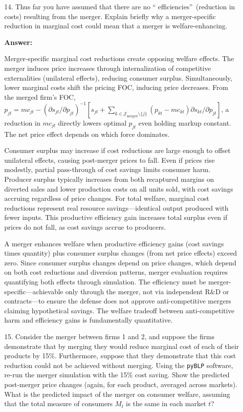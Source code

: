\documentclass[english,11pt]{article}
\begin{document}
\begin{enumerate}
\item[14.] Thus far you have assumed that there are no \textquotedblleft
efficiencies\textquotedblright\ (reduction in costs) resulting from the
merger. Explain briefly why a merger-specific reduction in marginal cost
could mean that a merger is welfare-enhancing.

\textbf{Answer:}

Merger-specific marginal cost reductions create opposing welfare effects. The merger induces price increases through internalization of competitive externalities (unilateral effects), reducing consumer surplus. Simultaneously, lower marginal costs shift the pricing FOC, inducing price decreases. From the merged firm's FOC, $p_{jt} = mc_{jt} - (\partial s_{jt}/\partial p_{jt})^{-1} [s_{jt} + \sum_{k \in \mathcal{J}_{\text{merged}} \setminus \{j\}} (p_{kt} - mc_{kt}) \partial s_{kt}/\partial p_{jt}]$, a reduction in $mc_{jt}$ directly lowers optimal $p_{jt}$ even holding markup constant. The net price effect depends on which force dominates.

Consumer surplus may increase if cost reductions are large enough to offset unilateral effects, causing post-merger prices to fall. Even if prices rise modestly, partial pass-through of cost savings limits consumer harm. Producer surplus typically increases from both recaptured margins on diverted sales and lower production costs on all units sold, with cost savings accruing regardless of price changes. For total welfare, marginal cost reductions represent real resource savings---identical output produced with fewer inputs. This productive efficiency gain increases total surplus even if prices do not fall, as cost savings accrue to producers.

A merger enhances welfare when productive efficiency gains (cost savings times quantity) plus consumer surplus changes (from net price effects) exceed zero. Since consumer surplus changes depend on price changes, which depend on both cost reductions and diversion patterns, merger evaluation requires quantifying both effects through simulation. The efficiency must be merger-specific---achievable only through the merger, not via independent R\&D or contracts---to ensure the defense does not approve anti-competitive mergers claiming hypothetical savings. The welfare tradeoff between anti-competitive harm and efficiency gains is fundamentally quantitative.

\item[15.] Consider the merger between firms 1 and 2, and suppose the firms
demonstrate that by merging they would reduce marginal cost of each of their
products by 15\%. Furthermore, suppose that they demonstrate that this cost
reduction could not be achieved without merging.    Using the \texttt{pyBLP} software, re-run the merger simulation
with the 15\% cost saving. Show the predicted post-merger price changes (again,
for each product, averaged across markets). What is the predicted impact of
the merger on consumer welfare, assuming that the total measure of consumers $%
M_{t} $ is the same in each market  $t$?  


\end{enumerate}
\end{document}
